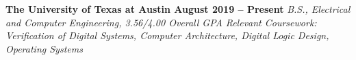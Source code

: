 \documentclass[../main.tex]{subfiles}
\begin{document}
%
\hspace*{4mm}\textbf{{\fontsize{\textFontSize}{\textFontBox}\selectfont The University of Texas at Austin \hfill August 2019 – Present}}
\vspace{-1mm}\newline
%
%
\hspace*{4mm}\textit{{\fontsize{\textFontSize}{\textFontBox}\selectfont B.S., Electrical and Computer Engineering, 3.56/4.00 Overall GPA }}\vspace{-1mm}\newline
\hspace*{4mm}\textit{{\fontsize{\textFontSize}{\textFontBox}\selectfont Relevant Coursework: Verification of Digital Systems, Computer Architecture, Digital Logic Design, Operating Systems }}\vspace{-4mm}\newline
%
%
\end{document}
